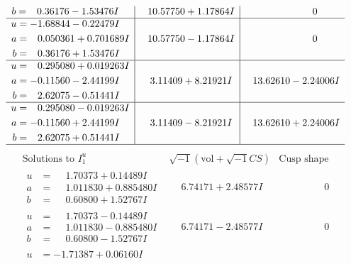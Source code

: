 \documentclass[1p]{elsarticle_modified}
\theoremstyle{definition}
\newcommand{\I}{\sqrt{-1}}
\begin{document}
$$\begin{array}{c|c|c}
\begin{aligned}
b &= \phantom{-}0.36176 - 1.53476 I\end{aligned}
 & \phantom{-}10.57750 + 1.17864 I & \phantom{-0.000000 } 0 \\ \hline\begin{aligned}
u &= -1.68844 - 0.22479 I \\
a &= \phantom{-}0.050361 + 0.701689 I \\
b &= \phantom{-}0.36176 + 1.53476 I\end{aligned}
 & \phantom{-}10.57750 - 1.17864 I & \phantom{-0.000000 } 0 \\ \hline\begin{aligned}
u &= \phantom{-}0.295080 + 0.019263 I \\
a &= -0.11560 - 2.44199 I \\
b &= \phantom{-}2.62075 - 0.51441 I\end{aligned}
 & \phantom{-}3.11409 + 8.21921 I & \phantom{-}13.62610 - 2.24006 I \\ \hline\begin{aligned}
u &= \phantom{-}0.295080 - 0.019263 I \\
a &= -0.11560 + 2.44199 I \\
b &= \phantom{-}2.62075 + 0.51441 I\end{aligned}
 & \phantom{-}3.11409 - 8.21921 I & \phantom{-}13.62610 + 2.24006 I\\
 \hline 
 \end{array}$$\newpage$$\begin{array}{c|c|c}  
\text{Solutions to }I^u_{1}& \I (\text{vol} + \sqrt{-1}CS) & \text{Cusp shape}\\
 \hline 
\begin{aligned}
u &= \phantom{-}1.70373 + 0.14489 I \\
a &= \phantom{-}1.011830 + 0.885480 I \\
b &= \phantom{-}0.60800 + 1.52767 I\end{aligned}
 & \phantom{-}6.74171 + 2.48577 I & \phantom{-0.000000 } 0 \\ \hline\begin{aligned}
u &= \phantom{-}1.70373 - 0.14489 I \\
a &= \phantom{-}1.011830 - 0.885480 I \\
b &= \phantom{-}0.60800 - 1.52767 I\end{aligned}
 & \phantom{-}6.74171 - 2.48577 I & \phantom{-0.000000 } 0 \\ \hline\begin{aligned}
u &= -1.71387 + 0.06160 I \\

\end{aligned}
\end{array}$$
\end{document}
